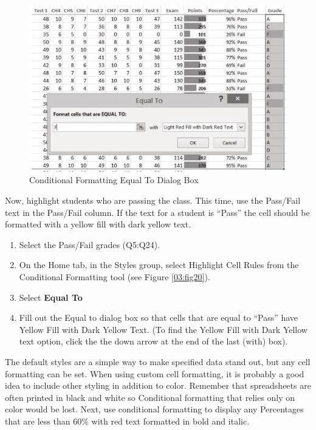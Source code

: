 \begin{figure}[H]
	\centering
	\includegraphics[width=\maxwidth{.95\linewidth}]{gfx/ch03_fig21}
	\caption{Conditional Formatting Equal To Dialog Box}
	\label{03:fig21}
\end{figure}

Now, highlight students who are passing the class. This time, use the Pass/Fail text in the Pass/Fail column. If the text for a student is ``Pass'' the cell should be formatted with a yellow fill with dark yellow text.

\begin{enumerate}
	\item Select the Pass/Fail grades (\textsf{Q5:Q24}).
	\item On the Home tab, in the Styles group, select Highlight Cell Rules from the Conditional Formatting tool (see Figure \ref{03:fig20}).
	\item Select \textbf{Equal To} 
	\item Fill out the Equal to dialog box so that cells that are equal to ``Pass'' have Yellow Fill with Dark Yellow Text. (To find the Yellow Fill with Dark Yellow text option, click the the down arrow at the end of the last (with) box).
\end{enumerate}

The default styles are a simple way to make specified data stand out, but any cell formatting can be set. When using custom cell formatting, it is probably a good idea to include other styling in addition to color. Remember that spreadsheets are often printed in black and white so Conditional formatting that relies only on color would be lost. Next, use conditional formatting to display any Percentages that are less than $ 60\% $ with red text formatted in bold and italic.

